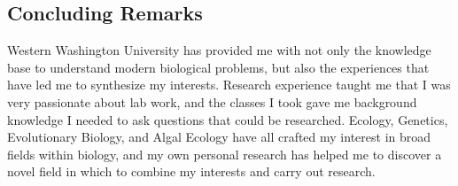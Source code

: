 \documentclass{article}
\begin{document}
\hypertarget{concluding-remarks}{%
\subsection{Concluding Remarks}\label{concluding-remarks}}

Western Washington University has provided me with not only the
knowledge base to understand modern biological problems, but also the
experiences that have led me to synthesize my interests. Research
experience taught me that I was very passionate about lab work, and the
classes I took gave me background knowledge I needed to ask questions
that could be researched. Ecology, Genetics, Evolutionary Biology, and
Algal Ecology have all crafted my interest in broad fields within
biology, and my own personal research has helped me to discover a novel
field in which to combine my interests and carry out research.


\printbibliography
\end{document}
